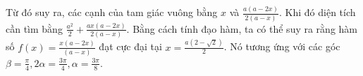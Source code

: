 \begin{multicols}{2}
	\vskip 0.1cm
	Từ đó suy ra, các cạnh của tam giác vuông bằng $x$ và  $\frac{{a(a - 2x)}}{{2(a - x)}}$. Khi đó diện tích cần tìm bằng $\frac{{{a^2}}}{2} + \frac{{ax(a - 2x)}}{{2(a - x)}}$. Bằng cách tính đạo hàm, ta có thể suy ra rằng hàm số $f(x) = \frac{{x(a - 2x)}}{{(a - x)}}$  đạt cực đại tại  $x = \frac{{a(2 - \sqrt 2 )}}{2}$. Nó tương ứng với các góc  $\beta = \frac{\pi}{4}, 2\alpha = \frac{3\pi}{4}, \alpha = \frac{3\pi}{8}$.
\end{multicols}
\newpage
\begingroup
